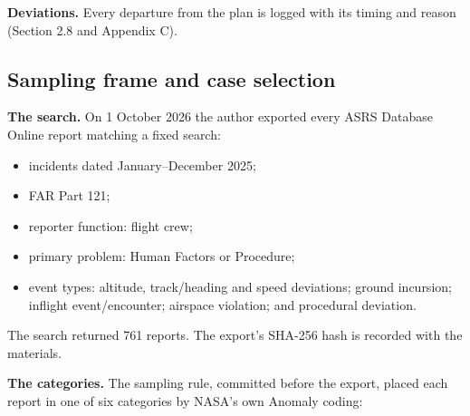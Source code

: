 \documentclass[11pt]{article}
\providecommand{\tightlist}{\setlength{\itemsep}{0pt}\setlength{\parskip}{0pt}}
\begin{document}
\textbf{Deviations.} Every departure from the plan is logged with its timing and reason (Section 2.8 and Appendix C).

\hypertarget{sampling-frame-and-case-selection}{%
\subsection{Sampling frame and case selection}\label{sampling-frame-and-case-selection}}

\textbf{The search.} On 1 October 2026 the author exported every ASRS Database Online report matching a fixed search:

\begin{itemize}
\tightlist
\item
  incidents dated January--December 2025;
\item
  FAR Part 121;
\item
  reporter function: flight crew;
\item
  primary problem: Human Factors or Procedure;
\item
  event types: altitude, track/heading and speed deviations; ground incursion; inflight event/encounter; airspace violation; and procedural deviation.
\end{itemize}

The search returned 761 reports. The export's SHA-256 hash is recorded with the materials.

\textbf{The categories.} The sampling rule, committed before the export, placed each report in one of six categories by NASA's own Anomaly coding:
\end{document}
